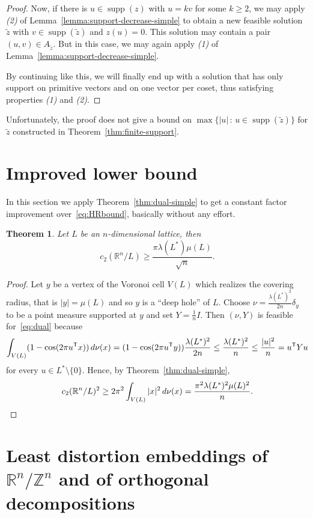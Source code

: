 \documentclass{amsart}
\newtheorem{theorem}[defin]{Theorem}
\newcommand{\R}{\mathbb{R}}
\newcommand{\Z}{\mathbb{Z}}
\DeclareMathOperator{\supp}{supp}
\begin{document}
\begin{proof}
	Now, if there is $ u \in \supp(z) $ with $ u = kv $ for some $ k \ge 2 $, we may apply \textit{(2)} of Lemma~\ref{lemma:support-decrease-simple} to obtain a new feasible solution $ \tilde{z} $ with $ v \in \supp(\tilde{z}) $ and $ z(u) = 0 $. This solution may contain a pair $ (u,v) \in A_{\tilde{z}} $. But in this case, we may again apply \textit{(1)} of Lemma~\ref{lemma:support-decrease-simple}.

	By continuing like this, we will finally end up with a solution that has only support on primitive vectors and on one vector per coset, thus satisfying properties \textit{(1)} and \textit{(2)}.
\end{proof}

Unfortunately, the proof does not give a bound on
$ \max \{|u| \, : \, u \in \supp(\tilde{z})\} $ for $ \tilde{z} $ constructed in Theorem~\ref{thm:finite-support}.

%
%
%

\section{Improved lower bound}
\label{sec:lower-bound}

In this section we apply Theorem~\ref{thm:dual-simple} to get a
constant factor improvement over~\eqref{eq:HRbound}, basically without
any effort.

\begin{theorem}
  \label{thm:lowerbound1}
Let $L$ be an $n$-dimensional lattice, then
\[
    c_2(\R^n/ L) \geq \frac{\pi \lambda(L^*) \mu(L)}{\sqrt{n}}.
\]
\end{theorem}

\begin{proof}
  Let $y$ be a vertex of the Voronoi cell $V(L)$ which realizes the
  covering radius, that is $|y| = \mu(L)$ and so $y$ is a ``deep hole'' of
  $L$. Choose $\nu = \frac{\lambda(L^*)^2}{2n} \delta_y$ to be a point
  measure supported at $y$ and set $Y = \frac{1}{n} I$. Then
  $(\nu, Y)$ is feasible for~\eqref{eq:dual} because
  \[
  \int_{V(L)} (1 - \cos(2\pi u^{\sf T} x)) \, d\nu(x) =
  (1-\cos(2\pi  u^{\sf T} y)) \frac{\lambda(L^*)^2}{2n}
  \leq \frac{\lambda(L^*)^2}{n} \leq \frac{|u|^2}{n} = u^{\sf T} Y u
 \]
 for every $u \in L^* \setminus \{0\}$.  Hence, by
 Theorem~\ref{thm:dual-simple},
\[
  c_2(\R^n / L)^2 \geq 2 \pi^2 \int_{V(L)} |x|^2 \, d\nu(x) =
  \frac{\pi^2 \lambda(L^*)^2 \mu(L)^2}{n}. \qedhere
\]
 \end{proof}

%
%
%
 \section{Least distortion embeddings of $\R^n / \Z^n$ and of orthogonal decompositions}
 \label{sec:standard-torus}
\end{document}
